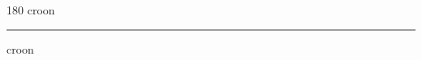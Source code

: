 
\begin{frame}
\begin{center}
\begin{turn}{180}
{\fontsize{2.5cm}{1em}\selectfont croon}
\end{turn}
\vspace{1em}\par  
\hrule
\vspace{1em}\par  
{\fontsize{2.5cm}{1em}\selectfont croon}
\end{center}
\end{frame}
